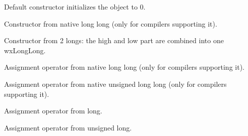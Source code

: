 

\label{wxlonglongwxlonglongdef}


Default constructor initializes the object to 0.


\label{wxlonglongwxlonglongll}


Constructor from native long long (only for compilers supporting it).


\label{wxlonglongwxlonglong}


Constructor from 2 longs: the high and low part are combined into one
wxLongLong.


\label{wxlonglongoperatorassign}


Assignment operator from native long long (only for compilers supporting it).


\label{wxlonglongoperatorassignull}


Assignment operator from native unsigned long long (only for compilers 
supporting it).


\label{wxlonglongoperatorassignlong}


Assignment operator from long.


\label{wxlonglongoperatorassignulong}


Assignment operator from unsigned long.


\label{wxlonglongoperatorassignulonglong}


